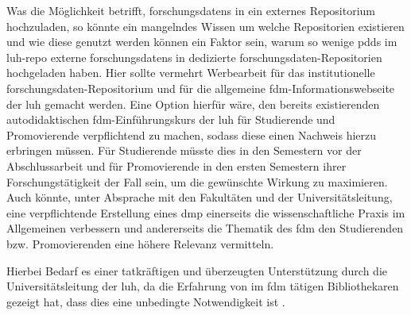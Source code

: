 Was die Möglichkeit betrifft, \glspl{forschungsdaten} in ein externes Repositorium hochzuladen, so könnte ein mangelndes Wissen um welche Repositorien existieren und wie diese genutzt werden können ein Faktor sein, warum so wenige \glspl{pdd} im \gls{luh-repo} externe \glspl{forschungsdaten} in dedizierte \gls{forschungsdaten}-Repositorien hochgeladen haben.
Hier sollte vermehrt Werbearbeit für das institutionelle \gls{forschungsdaten}-Repositorium und für die allgemeine \gls{fdm}-Informationswebseite der \gls{luh} gemacht werden.
Eine Option hierfür wäre, den bereits existierenden autodidaktischen \gls{fdm}-Einführungskurs der \gls{luh} für Studierende und Promovierende verpflichtend zu machen, sodass diese einen Nachweis hierzu erbringen müssen.
Für Studierende müsste dies in den Semestern vor der Abschlussarbeit und für Promovierende in den ersten Semestern ihrer Forschungstätigkeit der Fall sein, um die gewünschte Wirkung zu maximieren.
Auch könnte, unter Absprache mit den Fakultäten und der Universitätsleitung, eine verpflichtende Erstellung eines \gls{dmp} einerseits die wissenschaftliche Praxis im Allgemeinen verbessern und andererseits die Thematik des \gls{fdm} den Studierenden bzw. Promovierenden eine höhere Relevanz vermitteln.


Hierbei Bedarf es einer tatkräftigen und überzeugten Unterstützung durch die Universitätsleitung der \gls{luh}, da die Erfahrung von im \gls{fdm} tätigen Bibliothekaren gezeigt hat, dass dies eine unbedingte Notwendigkeit ist \autocite{Dellmann2022}.

